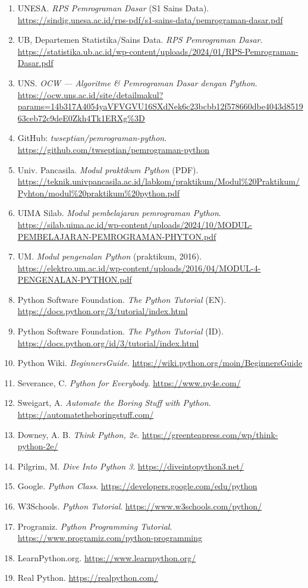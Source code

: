 \begin{enumerate}[leftmargin=*]
  \item UNESA. \textit{RPS Pemrograman Dasar} (S1 Sains Data). \url{https://sindig.unesa.ac.id/rps-pdf/s1-sains-data/pemrograman-dasar.pdf}
  \item UB, Departemen Statistika/Sains Data. \textit{RPS Pemrograman Dasar}. \url{https://statistika.ub.ac.id/wp-content/uploads/2024/01/RPS-Pemrograman-Dasar.pdf}
  \item UNS. \textit{OCW --- Algoritme \& Pemrograman Dasar dengan Python}. \url{https://ocw.uns.ac.id/site/detailmakul?params=14b317A4054yaVFVGVU16SXdNek6c23bcbb12f578660dbe4043d851963ceb72c9deE0Zkh4Tk1ERXg%3D}
  \item GitHub: \textit{twseptian/pemrograman-python}. \url{https://github.com/twseptian/pemrograman-python}
  \item Univ. Pancasila. \textit{Modul praktikum Python} (PDF). \url{https://teknik.univpancasila.ac.id/labkom/praktikum/Modul%20Praktikum/Pyhton/modul%20praktikum%20python.pdf}
  \item UIMA Silab. \textit{Modul pembelajaran pemrograman Python}. \url{https://silab.uima.ac.id/wp-content/uploads/2024/10/MODUL-PEMBELAJARAN-PEMROGRAMAN-PHYTON.pdf}
  \item UM. \textit{Modul pengenalan Python} (praktikum, 2016). \url{https://elektro.um.ac.id/wp-content/uploads/2016/04/MODUL-4-PENGENALAN-PYTHON.pdf}
  \item Python Software Foundation. \textit{The Python Tutorial} (EN). \url{https://docs.python.org/3/tutorial/index.html}
  \item Python Software Foundation. \textit{The Python Tutorial} (ID). \url{https://docs.python.org/id/3/tutorial/index.html}
  \item Python Wiki. \textit{BeginnersGuide}. \url{https://wiki.python.org/moin/BeginnersGuide}
  \item Severance, C. \textit{Python for Everybody}. \url{https://www.py4e.com/}
  \item Sweigart, A. \textit{Automate the Boring Stuff with Python}. \url{https://automatetheboringstuff.com/}
  \item Downey, A. B. \textit{Think Python, 2e}. \url{https://greenteapress.com/wp/think-python-2e/}
  \item Pilgrim, M. \textit{Dive Into Python 3}. \url{https://diveintopython3.net/}
  \item Google. \textit{Python Class}. \url{https://developers.google.com/edu/python}
  \item W3Schools. \textit{Python Tutorial}. \url{https://www.w3schools.com/python/}
  \item Programiz. \textit{Python Programming Tutorial}. \url{https://www.programiz.com/python-programming}
  \item LearnPython.org. \url{https://www.learnpython.org/}
  \item Real Python. \url{https://realpython.com/}
\end{enumerate}

